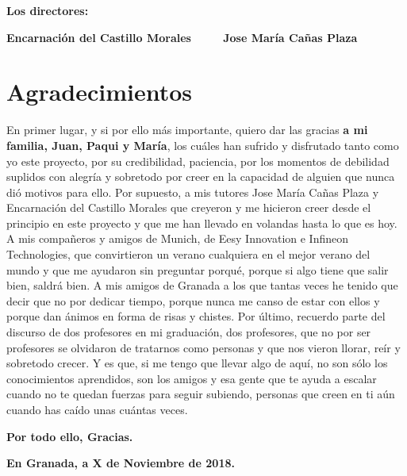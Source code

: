 \vspace{1cm}

\textbf{Los directores:}

\vspace{5cm}

\noindent \textbf{Encarnación del Castillo Morales\ \ \ \ \ Jose María Cañas Plaza}

\chapter*{Agradecimientos}
\thispagestyle{empty}

       \vspace{1cm}

En primer lugar, y si por ello más importante, quiero dar las gracias {\bf a mi familia, Juan, Paqui y María}, los cuáles han sufrido y disfrutado tanto como yo este proyecto, por su credibilidad, paciencia, por los momentos de debilidad suplidos con alegría y sobretodo por creer en la capacidad de alguien que nunca dió motivos para ello.  \newline
Por supuesto, a mis tutores Jose María Cañas Plaza y Encarnación del Castillo Morales que creyeron y me hicieron creer desde el principio en este proyecto y que me han llevado en volandas hasta lo que es hoy. \newline
A mis compañeros y amigos de Munich, de Eesy Innovation e Infineon Technologies, que convirtieron un verano cualquiera en el mejor verano del mundo y que me ayudaron sin preguntar porqué, porque si algo tiene que salir bien, saldrá bien. \newline 
A mis amigos de Granada a los que tantas veces he tenido que decir que no por dedicar tiempo, porque nunca me canso de estar con ellos y porque dan ánimos en forma de risas y chistes.\newline
Por último, recuerdo parte del discurso de dos profesores en mi graduación, dos profesores, que no por ser profesores se olvidaron de tratarnos como personas y que nos vieron llorar, reír y sobretodo crecer. Y es que, si me tengo que llevar algo de aquí, no son sólo los conocimientos aprendidos, son los amigos y esa gente que te ayuda a escalar cuando no te quedan fuerzas para seguir subiendo, personas que creen en ti aún cuando has caído unas cuántas veces.

{\bf Por todo ello, Gracias.}

\vspace{1cm}

{\bf En Granada, a X de Noviembre de 2018.}

